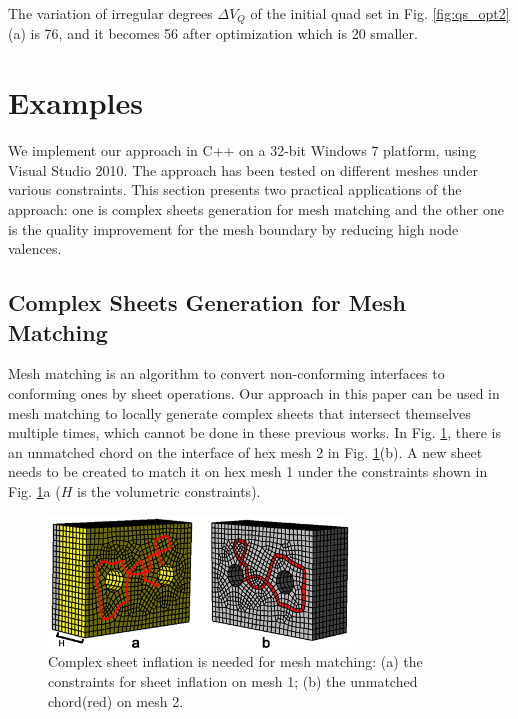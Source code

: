 \documentclass[final,5p,times,twocolumn]{elsarticle}
\begin{document}
The variation of irregular degrees $\Delta V_Q$ of the initial quad set in Fig. \ref{fig:qs_opt2}(a) is 76, and it becomes 56 after optimization which is 20 smaller.

\section{Examples}
\label{sec:examples}
We implement our approach in C++ on a 32-bit Windows 7 platform, using Visual Studio 2010. The approach has been tested on different meshes under various constraints. This section presents two practical applications of the approach: one is complex sheets generation for mesh matching and the other one is the quality improvement for the mesh boundary by reducing high node valences.

\subsection{Complex Sheets Generation for Mesh Matching}
\label{sec:mesh_matching}
Mesh matching is an algorithm to convert non-conforming interfaces to conforming ones by sheet operations\cite{Chen:2015kf,Staten2010d}. Our approach in this paper can be used in mesh matching to locally generate complex sheets that intersect themselves multiple times, which cannot be done in these previous works. In Fig. \ref{fig:exam1_input}, there is an unmatched chord on the interface of hex mesh 2 in Fig. \ref{fig:exam1_input}(b). A new sheet needs to be created to match it on hex mesh 1 under the constraints shown in Fig. \ref{fig:exam1_input}a ($H$ is the volumetric constraints).

\begin{figure}[htbp]
\begin{center}
\includegraphics[width=8cm]{figures/exam1_input.png}
\caption{Complex sheet inflation is needed for mesh matching: (a) the constraints for sheet inflation on mesh 1; (b) the unmatched chord(red) on mesh 2.}
\label{fig:exam1_input}
\end{center}
\end{figure}
\end{document}

